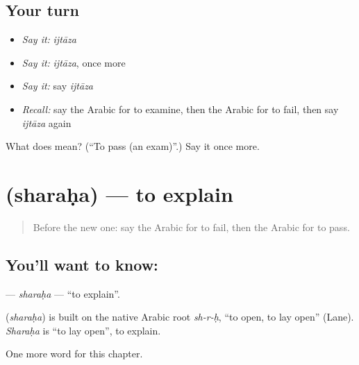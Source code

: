 \subsection*{Your turn}
\begin{itemize}
\raggedright
  \item \emph{Say it:} \emph{ijtāza}
  \item \emph{Say it:} \emph{ijtāza}, once more
  \item \emph{Say it:} say \emph{ijtāza}
  \item \emph{Recall:} say the Arabic for to examine, then the Arabic for to fail, then say \emph{ijtāza} again
\end{itemize}

\begin{tcolorbox}[breakable,colback=teal!4,colframe=teal!35!black,title={Before you move on}]
What does  mean? (\textquotedblleft{}To pass (an exam)\textquotedblright{}.) Say it once more.
\end{tcolorbox}
\section[\texorpdfstring{\ar{شرح} (sharaḥa)}{شرح (sharaḥa)}]{ (sharaḥa) — to explain}

\label{lesson:AR-C256-sharaha}



\begin{quote}
Before the new one: say the Arabic for to fail, then the Arabic for to pass.
\end{quote}

\subsection*{You'll want to know: }
\textbf{} — \emph{sharaḥa} — \textquotedblleft{}to explain\textquotedblright{}.

\begin{cousinweb}
\textbf{} (\emph{sharaḥa}) is built on the native Arabic root \emph{sh-r-ḥ}, \textquotedblleft{}to open, to lay open\textquotedblright{} (Lane). \emph{Sharaḥa} is \textquotedblleft{}to lay open\textquotedblright{}, to explain.
\end{cousinweb}

\begin{grammarlens}[title={What you've built}]
One more word for this chapter.
\end{grammarlens}


